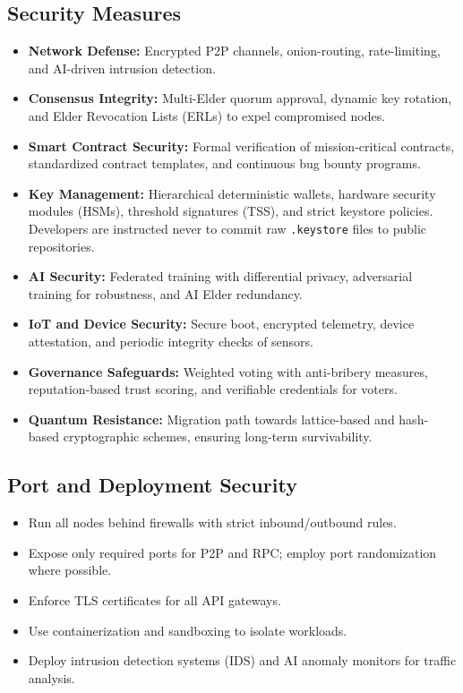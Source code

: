\documentclass[11pt,a4paper]{article}
\begin{document}
\subsection{Security Measures}
\begin{itemize}
    \item \textbf{Network Defense:}  
    Encrypted P2P channels, onion-routing, rate-limiting, and AI-driven intrusion detection.  

    \item \textbf{Consensus Integrity:}  
    Multi-Elder quorum approval, dynamic key rotation, and Elder Revocation Lists (ERLs) to expel compromised nodes.  

    \item \textbf{Smart Contract Security:}  
    Formal verification of mission-critical contracts, standardized contract templates, and continuous bug bounty programs.  

    \item \textbf{Key Management:}  
    Hierarchical deterministic wallets, hardware security modules (HSMs), threshold signatures (TSS), and strict keystore policies.  
    Developers are instructed never to commit raw \texttt{.keystore} files to public repositories.  

    \item \textbf{AI Security:}  
    Federated training with differential privacy, adversarial training for robustness, and AI Elder redundancy.  

    \item \textbf{IoT and Device Security:}  
    Secure boot, encrypted telemetry, device attestation, and periodic integrity checks of sensors.  

    \item \textbf{Governance Safeguards:}  
    Weighted voting with anti-bribery measures, reputation-based trust scoring, and verifiable credentials for voters.  

    \item \textbf{Quantum Resistance:}  
    Migration path towards lattice-based and hash-based cryptographic schemes, ensuring long-term survivability.  
\end{itemize}

\subsection{Port and Deployment Security}
\begin{itemize}
    \item Run all nodes behind firewalls with strict inbound/outbound rules.  
    \item Expose only required ports for P2P and RPC; employ port randomization where possible.  
    \item Enforce TLS certificates for all API gateways.  
    \item Use containerization and sandboxing to isolate workloads.  
    \item Deploy intrusion detection systems (IDS) and AI anomaly monitors for traffic analysis.  
\end{itemize}
\end{document}
